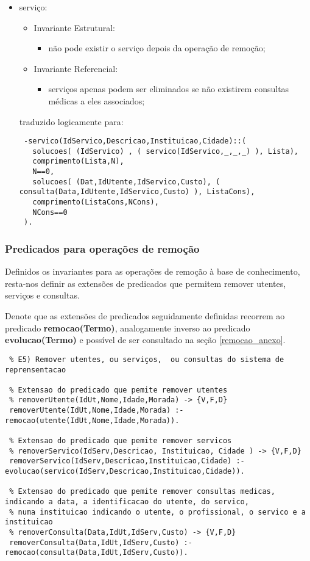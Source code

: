 \documentclass[
  oneside,
  10pt, a4paper,
  footinclude=true,
  headinclude=true,
  cleardoublepage=empty
]{scrbook}
\begin{document}
\begin{itemize}
\item   serviço:
\begin{itemize}
\item        Invariante Estrutural:
\begin{itemize}
\item         não pode existir o serviço depois da operação de remoção;
\end{itemize}
\item        Invariante Referencial:
\begin{itemize}
\item         serviços apenas podem ser eliminados se não existirem consultas médicas a eles associados;
\end{itemize}
\end{itemize}
traduzido logicamente para:
\begin{lstlisting}
 -servico(IdServico,Descricao,Instituicao,Cidade)::(
   solucoes( (IdServico) , ( servico(IdServico,_,_,_) ), Lista),
   comprimento(Lista,N),
   N==0,
   solucoes( (Dat,IdUtente,IdServico,Custo), ( consulta(Data,IdUtente,IdServico,Custo) ), ListaCons),
   comprimento(ListaCons,NCons),
   NCons==0
 ).
\end{lstlisting}


\end{itemize}
\subsubsection{Predicados para operações de remoção}
Definidos os invariantes para as operações de remoção à base de conhecimento, resta-nos definir as extensões de predicados que permitem remover utentes, serviços e consultas.\par
Denote que as extensões de predicados seguidamente definidas recorrem ao predicado \textbf{remocao(Termo)}, analogamente inverso ao predicado  \textbf{evolucao(Termo)} e possível de ser consultado na seção \ref{remocao_anexo}.

\begin{lstlisting}
 % E5) Remover utentes, ou serviços,  ou consultas do sistema de reprensentacao
 
 % Extensao do predicado que pemite remover utentes
 % removerUtente(IdUt,Nome,Idade,Morada) -> {V,F,D}
 removerUtente(IdUt,Nome,Idade,Morada) :- remocao(utente(IdUt,Nome,Idade,Morada)).
 
 % Extensao do predicado que pemite remover servicos
 % removerServico(IdServ,Descricao, Instituicao, Cidade ) -> {V,F,D}
 removerServico(IdServ,Descricao,Instituicao,Cidade) :- evolucao(servico(IdServ,Descricao,Instituicao,Cidade)).
 
 % Extensao do predicado que pemite remover consultas medicas, indicando a data, a identificacao do utente, do servico,
 % numa instituicao indicando o utente, o profissional, o servico e a instituicao
 % removerConsulta(Data,IdUt,IdServ,Custo) -> {V,F,D}
 removerConsulta(Data,IdUt,IdServ,Custo) :- remocao(consulta(Data,IdUt,IdServ,Custo)).
 
\end{lstlisting}
\end{document}

